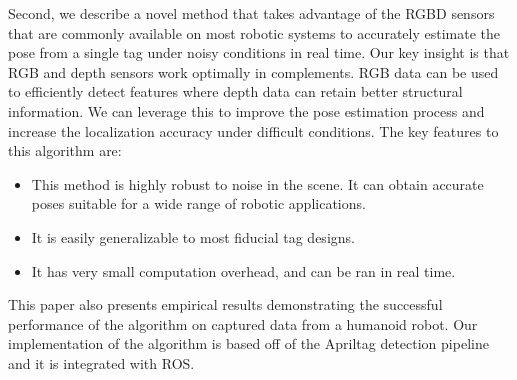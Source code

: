 Second, we describe a novel method that takes advantage of the RGBD sensors that are commonly available on most robotic systems to accurately estimate the pose from a single tag under noisy conditions in real time. Our key insight is that RGB and depth sensors work optimally in complements. RGB data can be used to efficiently detect features where depth data can retain better structural information. We can leverage this to improve the pose estimation process and increase the localization accuracy under difficult conditions. The key features to this algorithm are: 
\begin{itemize}
\item This method is highly robust to noise in the scene. It can obtain accurate poses suitable for a wide range of robotic applications.   
\item It is easily generalizable to most fiducial tag designs.
\item It has very small computation overhead, and can be ran in real time. 
\end{itemize}

This paper also presents empirical results demonstrating the successful performance of the algorithm on captured data from a humanoid robot. Our implementation of the algorithm is based off of the Apriltag detection pipeline and it is integrated with ROS. 